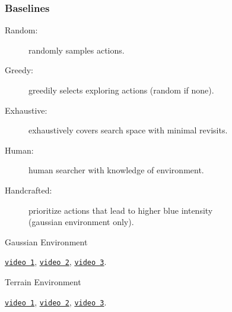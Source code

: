 \begin{frame}
    \frametitle{Baselines}


    \begin{description}
        \item [Random:] randomly samples actions.
        \item [Greedy:] greedily selects exploring actions (random if none).
        \item [Exhaustive:] exhaustively covers search space with minimal revisits.
        \item [Human:] human searcher with knowledge of environment.
        \item[Handcrafted:] prioritize actions that lead to higher blue intensity\\ (gaussian environment only).
    \end{description}
\end{frame}


\begin{frame}
    \begin{table}
        \centering
        Gaussian Environment\par\vspace{0.5em}
        
    \end{table} 

    \begin{center}
        \href{run:./videos/gaussian/map/2.mp4}{\texttt{video 1}},
        \href{run:./videos/gaussian/map/1.mp4}{\texttt{video 2}},
        \href{run:./videos/gaussian/map/0.mp4}{\texttt{video 3}}.
    \end{center}
\end{frame}

\begin{frame}
    \begin{table}
        \centering
        Terrain Environment\par\vspace{0.5em}
        
    \end{table}

    \begin{center}
        \href{run:./videos/terrain/map/0.mp4}{\texttt{video 1}},
        \href{run:./videos/terrain/map/1.mp4}{\texttt{video 2}},
        \href{run:./videos/terrain/map/2.mp4}{\texttt{video 3}}.
    \end{center}
\end{frame}

